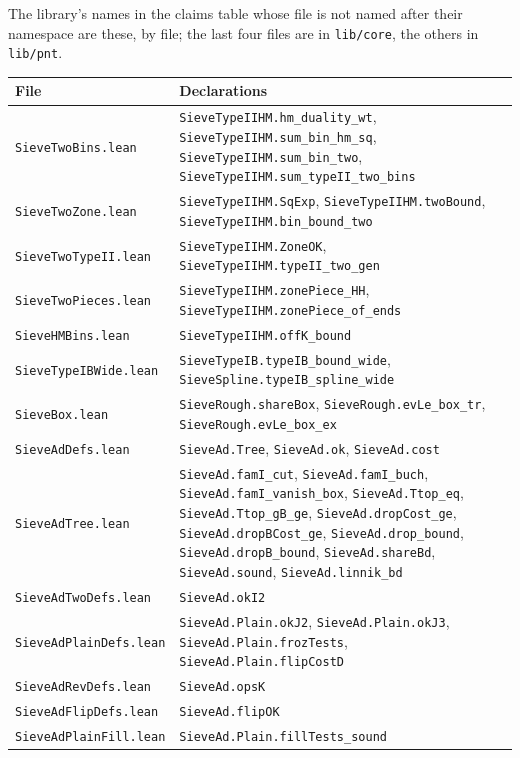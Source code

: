 \documentclass[11pt]{article}
\theoremstyle{definition}
\newcommand{\lean}[1]{\texttt{#1}}
\newcommand{\file}[1]{\nolinkurl{#1}}
\begin{document}
The library's names in the claims table whose file is not named after their namespace are these, by file; the last
four files are in \file{lib/core}, the others in \file{lib/pnt}.
{\footnotesize
\begin{longtable}{@{}l>{\raggedright\arraybackslash}p{}@{}}
\toprule
File & Declarations \\
\midrule
\endhead
\file{SieveTwoBins.lean} & \lean{SieveTypeIIHM.hm\_duality\_wt}, \lean{SieveTypeIIHM.sum\_bin\_hm\_sq},
\lean{SieveTypeIIHM.sum\_bin\_two}, \lean{SieveTypeIIHM.sum\_typeII\_two\_bins} \\
\file{SieveTwoZone.lean} & \lean{SieveTypeIIHM.SqExp}, \lean{SieveTypeIIHM.twoBound},
\lean{SieveTypeIIHM.bin\_bound\_two} \\
\file{SieveTwoTypeII.lean} & \lean{SieveTypeIIHM.ZoneOK}, \lean{SieveTypeIIHM.typeII\_two\_gen} \\
\file{SieveTwoPieces.lean} & \lean{SieveTypeIIHM.zonePiece\_HH}, \lean{SieveTypeIIHM.zonePiece\_of\_ends} \\
\file{SieveHMBins.lean} & \lean{SieveTypeIIHM.offK\_bound} \\
\file{SieveTypeIBWide.lean} & \lean{SieveTypeIB.typeIB\_bound\_wide}, \lean{SieveSpline.typeIB\_spline\_wide} \\
\file{SieveBox.lean} & \lean{SieveRough.shareBox}, \lean{SieveRough.evLe\_box\_tr}, \lean{SieveRough.evLe\_box\_ex} \\
\file{SieveAdDefs.lean} & \lean{SieveAd.Tree}, \lean{SieveAd.ok}, \lean{SieveAd.cost} \\
\file{SieveAdTree.lean} & \lean{SieveAd.famI\_cut}, \lean{SieveAd.famI\_buch}, \lean{SieveAd.famI\_vanish\_box},
\lean{SieveAd.Ttop\_eq}, \lean{SieveAd.Ttop\_gB\_ge}, \lean{SieveAd.dropCost\_ge}, \lean{SieveAd.dropBCost\_ge},
\lean{SieveAd.drop\_bound}, \lean{SieveAd.dropB\_bound}, \lean{SieveAd.shareBd}, \lean{SieveAd.sound},
\lean{SieveAd.linnik\_bd} \\
\file{SieveAdTwoDefs.lean} & \lean{SieveAd.okI2} \\
\file{SieveAdPlainDefs.lean} & \lean{SieveAd.Plain.okJ2}, \lean{SieveAd.Plain.okJ3},
\lean{SieveAd.Plain.frozTests}, \lean{SieveAd.Plain.flipCostD} \\
\file{SieveAdRevDefs.lean} & \lean{SieveAd.opsK} \\
\file{SieveAdFlipDefs.lean} & \lean{SieveAd.flipOK} \\
\file{SieveAdPlainFill.lean} & \lean{SieveAd.Plain.fillTests\_sound} \\

\end{longtable}}
\end{document}
